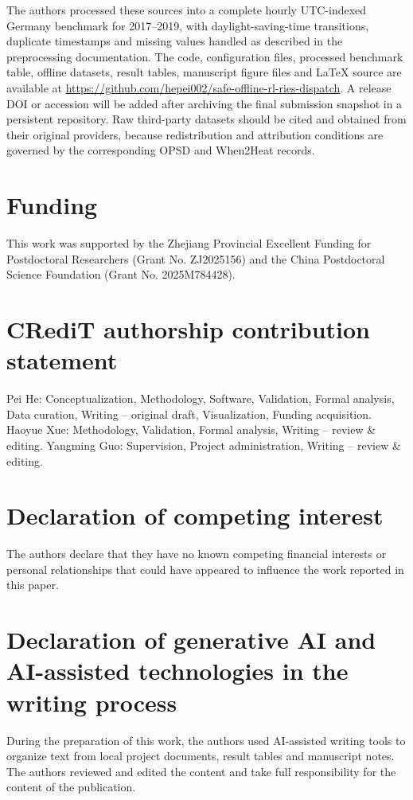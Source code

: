 \documentclass[preprint,12pt]{elsarticle}
\begin{document}
The authors processed these sources into a complete hourly UTC-indexed Germany benchmark for 2017--2019, with daylight-saving-time transitions, duplicate timestamps and missing values handled as described in the preprocessing documentation. The code, configuration files, processed benchmark table, offline datasets, result tables, manuscript figure files and LaTeX source are available at \url{https://github.com/hepei002/safe-offline-rl-ries-dispatch}. A release DOI or accession will be added after archiving the final submission snapshot in a persistent repository. Raw third-party datasets should be cited and obtained from their original providers, because redistribution and attribution conditions are governed by the corresponding OPSD and When2Heat records.

\section*{Funding}

This work was supported by the Zhejiang Provincial Excellent Funding for Postdoctoral Researchers (Grant No. ZJ2025156) and the China Postdoctoral Science Foundation (Grant No. 2025M784428).

\section*{CRediT authorship contribution statement}

Pei He: Conceptualization, Methodology, Software, Validation, Formal analysis, Data curation, Writing -- original draft, Visualization, Funding acquisition. Haoyue Xue: Methodology, Validation, Formal analysis, Writing -- review \& editing. Yangming Guo: Supervision, Project administration, Writing -- review \& editing.

\section*{Declaration of competing interest}

The authors declare that they have no known competing financial interests or personal relationships that could have appeared to influence the work reported in this paper.

\section*{Declaration of generative AI and AI-assisted technologies in the writing process}

During the preparation of this work, the authors used AI-assisted writing tools to organize text from local project documents, result tables and manuscript notes. The authors reviewed and edited the content and take full responsibility for the content of the publication.


\end{document}
